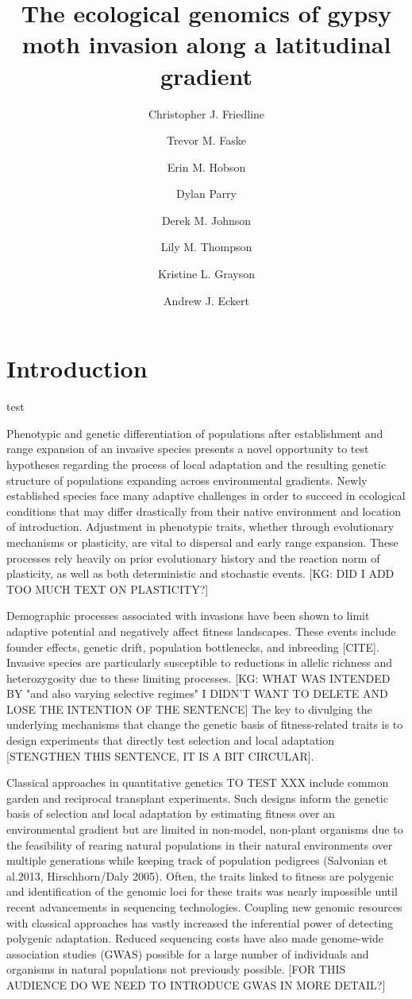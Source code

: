 \documentclass[fleqn,11pt]{wlpeerj}
\title{The ecological genomics of gypsy moth invasion along a latitudinal
gradient}
\author[1]{Christopher J. Friedline}
\author[1]{Trevor M. Faske}
\author[1]{Erin M. Hobson}
\author[2]{Dylan Parry}
\author[1]{Derek M. Johnson}
\author[3]{Lily M. Thompson}
\author[3,*]{Kristine L. Grayson}
\author[1,*,\textdagger]{Andrew J. Eckert}
\affil[1]{Department of Biology, Virginia Commonwealth University}
\affil[2]{College of Environmental Science and Forestry, State University of
New York}
\affil[3]{Department of Biology, University of Richmond}
\affil[*]{Authors contributed equally}
\affil[ \textdagger]{Corresponding author}
\begin{document}
\flushbottom
\maketitle
\thispagestyle{empty}

\linenumbers%

\section*{Introduction}

test

Phenotypic and genetic differentiation of populations after establishment and range expansion of an invasive species presents a novel opportunity to test hypotheses regarding the process of local adaptation and the resulting genetic structure of populations expanding across environmental gradients. Newly established species face many adaptive challenges in order to succeed in ecological conditions that may differ drastically from their native environment and location of introduction. Adjustment in phenotypic traits, whether through evolutionary mechanisms or plasticity, are vital to dispersal and early range expansion. These processes rely heavily on prior evolutionary history and the reaction norm of plasticity, as well as both deterministic and stochastic events. [KG: DID I ADD TOO MUCH TEXT ON PLASTICITY?]
 
Demographic processes associated with invasions have been shown to limit adaptive potential and negatively affect fitness landscapes. These events include founder effects, genetic drift, population bottlenecks, and inbreeding [CITE].  Invasive species are particularly susceptible to reductions in allelic richness and heterozygosity due to these limiting processes. [KG: WHAT WAS INTENDED BY "and also varying selective regimes" I DIDN'T WANT TO DELETE AND LOSE THE INTENTION OF THE SENTENCE]  The key to divulging the underlying mechanisms that change the genetic basis of fitness-related traits is to design experiments that directly test selection and local adaptation [STENGTHEN THIS SENTENCE, IT IS A BIT CIRCULAR].
 
Classical approaches in quantitative genetics TO TEST XXX include common garden and reciprocal transplant experiments. Such designs inform the genetic basis of selection and local adaptation by estimating fitness over an environmental gradient but are limited in non-model, non-plant organisms due to the feasibility of rearing natural populations in their natural environments over multiple generations while keeping track of population pedigrees (Salvonian et al.2013, Hirschhorn/Daly 2005). Often, the traits linked to fitness are polygenic and identification of the genomic loci for these traits was nearly impossible until recent advancements in sequencing technologies. Coupling new genomic resources with classical approaches has vastly increased the inferential power of detecting polygenic adaptation. Reduced sequencing costs have also made genome-wide association studies (GWAS) possible for a large number of individuals and organisms in natural populations not previously possible. [FOR THIS AUDIENCE DO WE NEED TO INTRODUCE GWAS IN MORE DETAIL?]
\end{document}
